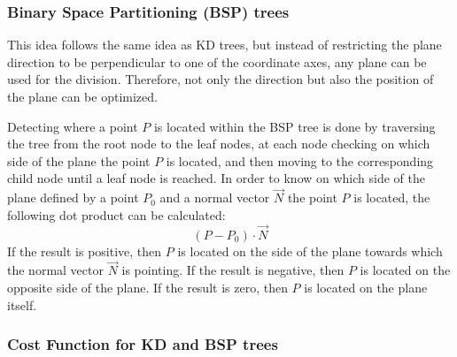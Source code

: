\subsubsection{Binary Space Partitioning (BSP) trees}

This idea follows the same idea as KD trees, but instead of restricting the plane direction to be perpendicular to one of the coordinate axes, any plane can be used for the division. Therefore, not only the direction but also the position of the plane can be optimized.

Detecting where a point $P$ is located within the BSP tree is done by traversing the tree from the root node to the leaf nodes, at each node checking on which side of the plane the point $P$ is located, and then moving to the corresponding child node until a leaf node is reached. In order to know on which side of the plane defined by a point $P_0$ and a normal vector $\vec{N}$ the point $P$ is located, the following dot product can be calculated:
\[(P - P_0) \cdot \vec{N}\]
If the result is positive, then $P$ is located on the side of the plane towards which the normal vector $\vec{N}$ is pointing. If the result is negative, then $P$ is located on the opposite side of the plane. If the result is zero, then $P$ is located on the plane itself.

\subsubsection{Cost Function for KD and BSP trees}

